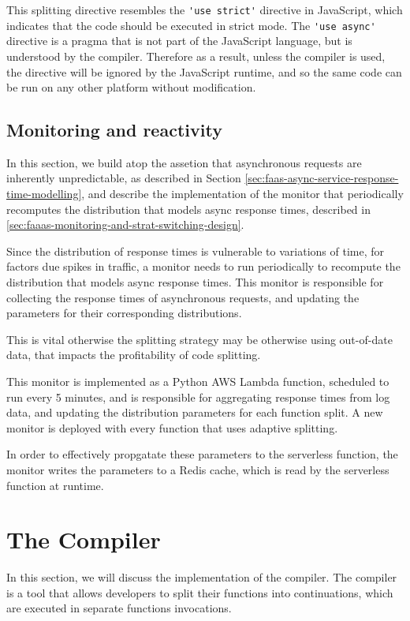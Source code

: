 This splitting directive resembles the \verb|'use strict'| directive in JavaScript, which indicates that the code should be executed in strict mode. The \verb|'use async'| directive is a pragma that is not part of the JavaScript language, but is understood by the \faaasc{} compiler. Therefore as a result, unless the \faaasc{} compiler is used, the directive will be ignored by the JavaScript runtime, and so the same code can be run on any other \faas{} platform without modification.

\subsection{Monitoring and reactivity}
In this section, we build atop the assetion that asynchronous requests are inherently unpredictable, as described in Section \ref{sec:faas-async-service-response-time-modelling}, and describe the implementation of the monitor that periodically recomputes the distribution that models async response times, described in \ref{sec:faaas-monitoring-and-strat-switching-design}.

Since the distribution of response times is vulnerable to variations of time, for factors due spikes in traffic, a monitor needs to run periodically to recompute the distribution that models async response times. This monitor is responsible for collecting the response times of asynchronous requests, and updating the parameters for their corresponding distributions.

This is vital otherwise the splitting strategy may be otherwise using out-of-date data, that impacts the profitability of code splitting.

This monitor is implemented as a Python AWS Lambda function, scheduled to run every 5 minutes, and is responsible for aggregating response times from log data, and updating the distribution parameters for each function split. A new monitor is deployed with every function that uses adaptive splitting.

In order to effectively propgatate these parameters to the serverless function, the monitor writes the parameters to a Redis cache, which is read by the serverless function at runtime.

\section{The \faaasc{} Compiler}
In this section, we will discuss the implementation of the \faaasc{} compiler. The \faaasc{} compiler is a tool that allows developers to split their functions into continuations, which are executed in separate \awslambda{} functions invocations.

